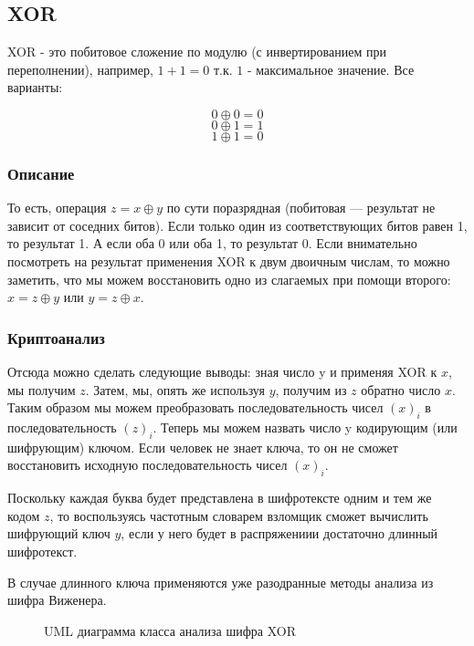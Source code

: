 \subsection{XOR}

XOR - это побитовое сложение по модулю (с инвертированием при переполнении), 
например, $1+1=0$ т.к. $1$ - максимальное значение. Все варианты:

$$0 \oplus 0=0$$
$$0 \oplus 1=1$$
$$1 \oplus 1=0$$

\subsubsection{Описание}
То есть, операция $z = x \oplus y$ по сути поразрядная (побитовая — 
результат не зависит от соседних битов). Если только один из 
соответствующих битов равен 1, то результат 1. А если оба 0 или 
оба 1, то результат 0. Если внимательно посмотреть на результат 
применения XOR к двум двоичным числам, то можно заметить, что 
мы можем восстановить одно из слагаемых при помощи второго: $x 
= z \oplus y$ или $y = z \oplus x$. 

\subsubsection{Криптоанализ}

Отсюда можно сделать следующие выводы: зная число y и применяя 
XOR к $x$, мы получим $z$. Затем, мы, опять же используя $y$, получим 
из $z$ обратно число $x$. Таким образом мы можем преобразовать последовательность 
чисел $(x)_i$ в последовательность $(z)_i$. Теперь мы можем назвать 
число y кодирующим (или шифрующим) ключом. Если человек не знает 
ключа, то он не сможет восстановить исходную последовательность 
чисел $(x)_i$.

Поскольку каждая буква будет представлена в шифротексте 
одним и тем же кодом $z$, то воспользуясь частотным словарем взломщик 
сможет вычислить шифрующий ключ $y$, если у него будет в распряжениии 
достаточно длинный шифротекст. 

В случае длинного ключа применяются уже разодранные методы 
анализа из шифра Виженера.

\begin{figure}[H]
\noindent{}
\caption{UML диаграмма класса анализа шифра XOR}
\label{figXOR}
\end{figure}
